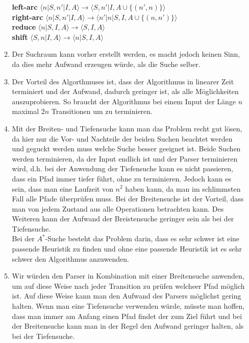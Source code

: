 \documentclass[a4paper]{scrartcl}
\begin{document}
\begin{enumerate}
\begin{enumerate}
		       \textbf{left-arc}   $\langle n|S,n'|I,A\rangle \rightarrow \langle S,n'|I,A \cup \{(n',n)\}\rangle$ \\
	            \textbf{right-arc} $\langle n |S, n' | I, A \rangle \rightarrow \langle n'|n|S, I, A \cup \{(n, n')\}\rangle$ \\
	            \textbf{reduce} $\langle n|S,I,A\rangle \rightarrow \langle S,I,A \rangle$ \\
	            \textbf{shift} $\langle S,n|I,A\rangle \rightarrow \langle n|S,I,A \rangle$ \\
				
			\item
				Der Suchraum kann vorher erstellt werden, es macht jedoch keinen Sinn, da dies
				mehr Aufwand erzeugen würde, als die Suche selber. \\
				
			\item
				Der Vorteil des Algorthmuses ist, dass der Algorithmus in linearer Zeit terminiert und der
				Aufwand, dadurch geringer ist, als alle Möglichkeiten auszuprobieren. So braucht der 
				Algorithmus bei einem Input der Länge $n$ maximal $2n$ Transitionen um zu terminieren.
				
			\item
				Mit der Breiten- und Tiefensuche kann man das Problem recht gut lösen, da hier nur 
				die Vor- und Nachteile der beiden Suchen beachtet werden und geguckt werden muss welche 
				Suche besser geeignet ist. Beide Suchen werden terminieren, da der Input endlich ist und
				der Parser terminieren wird, d.h. bei der Anwendung der Tiefensuche kann es nicht 
				passieren, dass ein Pfad immer tiefer führt, ohne zu terminieren. Jedoch kann es 
				sein, dass man eine Laufzeit von $n^2$ haben kann, da man im schlimmsten Fall alle
				Pfade überprüfen muss. Bei der Breitensuche ist der Vorteil, dass man von jedem Zustand
				aus alle Operationen betrachten kann. Des Weiteren kann der Aufwand der Breistensuche
				geringer sein als bei der Tiefensuche. \\
				Bei der $A^*$-Suche besteht das Problem darin, dass es sehr schwer ist eine passende
				Heuristik zu finden und ohne eine passende Heuristik ist es sehr schwer den Algorithmus
				anzuwenden. \\
				
			\item
				Wir würden den Parser in Kombination mit einer Breitensuche anwenden, um auf diese Weise
				nach jeder Transition zu prüfen welcheer Pfad möglich ist. Auf diese Weise kann man den 
				Aufwand des Parsers möglichst gering halten. Wenn man eine Tiefensuche verwenden würde,
				müsste man hoffen, dass man immer am Anfang einen Pfad findet der zum Ziel führt und bei 
				der Breitensuche kann man in der Regel den Aufwand geringer halten, als bei der 
				Tiefensuche.
				
				
				
				
		\end{enumerate}

\end{enumerate}
\end{document}
